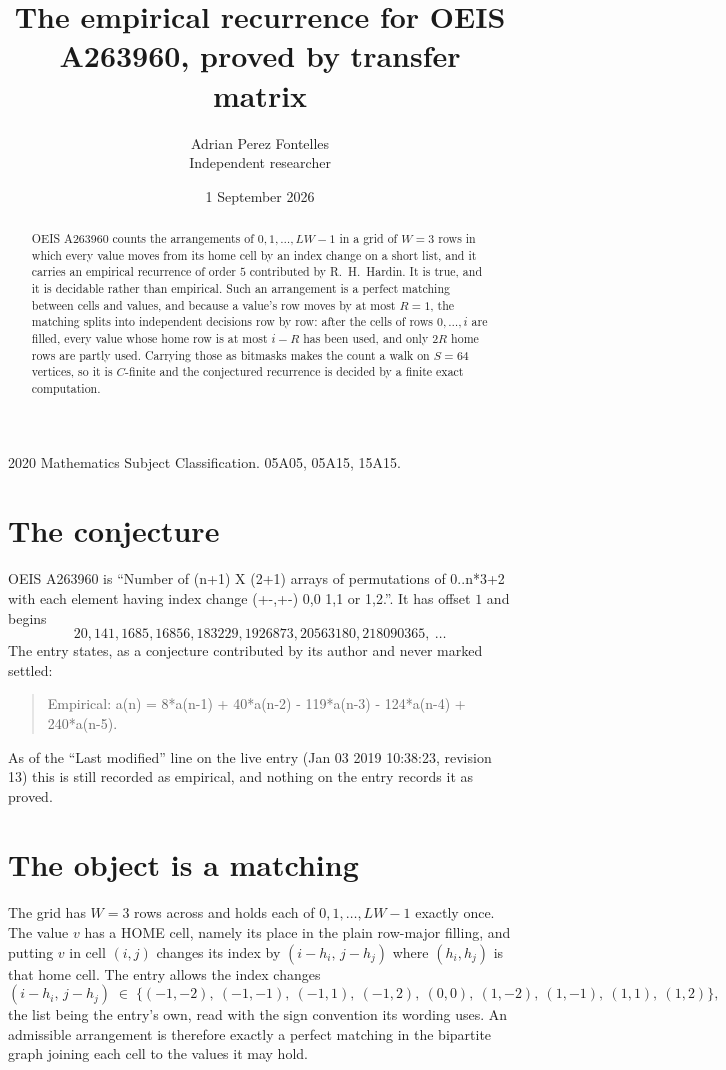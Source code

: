 \documentclass[11pt,a4paper]{article}
\title{The empirical recurrence for OEIS A263960, proved by transfer matrix}
\author{Adrian Perez Fontelles\\ \small Independent researcher}
\date{1 September 2026}
\theoremstyle{plain}
\theoremstyle{definition}
\begin{document}
\maketitle

\begin{abstract}
OEIS A263960 counts the arrangements of $0,1,\dots,LW-1$ in a grid of $W=3$ rows in which
every value moves from its home cell by an index change on a short list, and it carries an
empirical recurrence of order $5$ contributed by R.~H.~Hardin. It is true, and it is
decidable rather than empirical. Such an arrangement is a perfect matching between cells and
values, and because a value's row moves by at most $R=1$, the matching splits into
independent decisions row by row: after the cells of rows $0,\dots,i$ are filled,
every value whose home row is at most $i-R$ has been used, and only $2R$ home rows are
partly used. Carrying those as bitmasks makes the count a walk on $S=64$ vertices, so it is
$C$-finite and the conjectured recurrence is decided by a finite exact computation.
\end{abstract}

\noindent\small 2020 Mathematics Subject Classification. 05A05, 05A15, 15A15.\normalsize

\section{The conjecture}

OEIS A263960 is ``Number of (n+1) X (2+1) arrays of permutations of 0..n*3+2 with each element having index change (+-,+-) 0,0 1,1 or 1,2.''. It has offset $1$ and begins
\[
20, 141, 1685, 16856, 183229, 1926873, 20563180, 218090365,\ \dots
\]
The entry states, as a conjecture contributed by its author and never marked settled:
\begin{quote}
Empirical: a(n) = 8*a(n-1) + 40*a(n-2) - 119*a(n-3) - 124*a(n-4) + 240*a(n-5).
\end{quote}
As of the ``Last modified'' line on the live entry (Jan 03 2019 10:38:23, revision 13) this is still
recorded as empirical, and nothing on the entry records it as proved.

\section{The object is a matching}

The grid has $W=3$ rows across and holds each of $0,1,\dots,LW-1$ exactly once. The value
$v$ has a HOME cell, namely its place in the plain row-major filling, and putting $v$ in cell
$(i,j)$ changes its index by $(i-h_i,\,j-h_j)$ where $(h_i,h_j)$ is that home cell. The entry
allows the index changes
\[
(i-h_i,\,j-h_j)\;\in\;\{(-1,-2),\ (-1,-1),\ (-1,1),\ (-1,2),\ (0,0),\ (1,-2),\ (1,-1),\ (1,1),\ (1,2)\},
\]
the list being the entry's own, read with the sign convention its wording uses. An admissible
arrangement is therefore exactly a perfect matching in the bipartite graph joining each cell to
the values it may hold.
\end{document}
